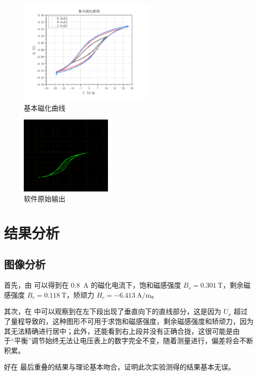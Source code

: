 \documentclass[a4paper,utf8]{article}
\begin{document}
    \begin{figure}[!ht]
        \includegraphics[width=0.6\textwidth]{fig4.pdf}
        \caption{基本磁化曲线}\label{fig:2c}
    \end{figure}
    \begin{figure}[!ht]
        \includegraphics[width=0.4\textwidth]{fig5.png}
        \caption{软件原始输出}\label{fig:2d}
    \end{figure}
    \newpage
\section{结果分析}
    \subsection{图像分析}
        首先，由  可以得到在 \SI{0.8}{\A} 的磁化电流下，饱和磁感强度 $B_s= \SI{0.301}{\tesla}$，剩余磁感强度 $B_r= \SI{0.118}{\tesla}$，矫顽力 $H_c= \SI{-6.413}{\A\per\m}$。\par
        其次，在  中可以观察到在左下段出现了垂直向下的直线部分，这是因为 $U_x$ 超过了量程导致的，这种图形不可用于求饱和磁感强度，剩余磁感强度和矫顽力，因为其无法精确进行居中；此外，还能看到右上段并没有正确合拢，这很可能是由于“平衡”调节始终无法让电压表上的数字完全不变，随着测量进行，偏差将会不断积累。\par
        好在  最后重叠的结果与理论基本吻合，证明此次实验测得的结果基本无误。
\end{document}

